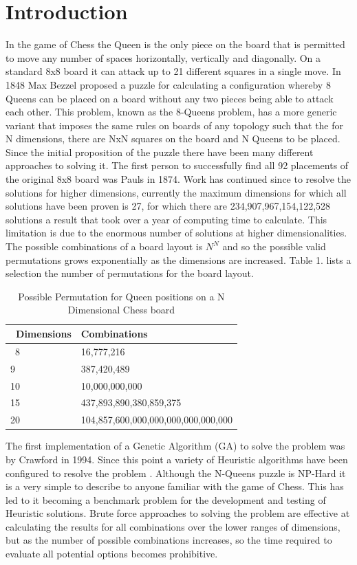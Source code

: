 \documentclass[conference]{IEEEtran}
\begin{document}
\section{Introduction}
In the game of Chess the Queen is the only piece on the board that is permitted to move any number of spaces horizontally, vertically and diagonally. On a standard 8x8 board it can attack up to 21 different squares in a single move. In 1848 Max Bezzel proposed a puzzle for calculating a configuration whereby 8 Queens can be placed on a board without any two pieces being able to attack each other. This problem, known as the 8-Queens problem, has a more generic variant that imposes the same rules on boards of any topology such that the for N dimensions, there are NxN squares on the board and N Queens to be placed. Since the initial proposition of the puzzle there have been many different approaches to solving it. The first person to successfully find all 92 placements of the original 8x8 board was Pauls \cite{Pauls} in 1874. Work has continued since to resolve the solutions for higher dimensions, currently the maximum dimensions for which all solutions have been proven is 27, for which there are 234,907,967,154,122,528 solutions a result that took over a year of computing time to calculate\cite{27Queens}. This limitation is due to the enormous number of solutions at higher dimensionalities. The possible combinations of a board layout is $N^{N}$ and so the possible valid permutations grows exponentially as the dimensions are increased. Table 1. lists a selection the number of permutations for the board layout.

\begin{table}[!htbp]
	\centering
	\begin{tabular}{|l |l|} 
		\hline\
		Dimensions & Combinations \\
		\hline\
		8 & 16,777,216 \\ 
		9 & 387,420,489 \\
		10 & 10,000,000,000 \\
		15 & 437,893,890,380,859,375 \\
		20 & 104,857,600,000,000,000,000,000,000\\
	\hline
	\end{tabular}
	\caption{Possible Permutation for Queen positions on a N Dimensional Chess board} 
\end{table}

The first implementation of a Genetic Algorithm (GA) to solve the problem was by Crawford \cite{Crawford} in 1994. Since this point a variety of Heuristic algorithms have been configured to resolve the problem \cite{AdvanceMutation} \cite{ACO} \cite{comparison} \cite{PSO}. Although the N-Queens puzzle is NP-Hard it is a very simple to describe to anyone familiar with the game of Chess. This has led to it becoming a benchmark problem for the development and testing of Heuristic solutions. Brute force approaches to solving the problem are effective at calculating the results for all combinations over the lower ranges of dimensions, but as the number of possible combinations increases, so the time required to evaluate all potential options becomes prohibitive.
\end{document}
